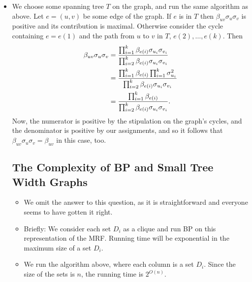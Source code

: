 \documentclass[11pt]{article} \usepackage{amssymb}
\begin{document}
\begin{itemize}
\item We choose some spanning tree $T$ on the graph, and run the same
  algorithm as above. Let $e=(u,v)$ be some edge of the graph. If $e$
  is in $T$ then $\beta_{uv}\sigma_u\sigma_v$ is positive and its
  contribution is maximal. Otherwise consider the cycle containing $e=e(1)$
  and the path from $u$ to $v$ in $T$, $e(2),\ldots,e(k)$. Then 
  \begin{align*}
    \beta_{uv}\sigma_u\sigma_v &=
    {\prod_{i=1}^k\beta_{e(i)}\sigma_{u_i}\sigma_{v_i}
      \over
      \prod_{i=2}^k\beta_{e(i)}\sigma_{u_i}\sigma_{v_i}
    }
    \\ &= 
    {\prod_{i=1}^k\beta_{e(i)}\prod_{i=1}^k\sigma_{u_i}^2
      \over
      \prod_{i=2}^k\beta_{e(i)}\sigma_{u_i}\sigma_{v_i}
    }
    \\ &= 
    {\prod_{i=1}^k\beta_{e(i)}
      \over
      \prod_{i=2}^k\beta_{e(i)}\sigma_{u_i}\sigma_{v_i}
    }.
  \end{align*}
  Now, the numerator is positive by the stipulation on the graph's
  cycles, and the denominator is positive by our assignments, and so
  it follows that  $\beta_{uv}\sigma_u\sigma_v=\beta_{uv}$ in this
  case, too.


\subsection{The Complexity of BP and Small Tree Width Graphs}
\begin{itemize}
\item We omit the answer to this question, as it is straightforward
  and everyone seems to have gotten it right.
\item Briefly: We consider each set $D_i$ as a clique and run BP on
  this representation of the MRF. Running time will be exponential in
  the maximum size of a set $D_i$. 
\item We run the algorithm above, where each column is a set
  $D_i$. Since the size of the sets is $n$, the running time is $2^{O(n)}$.
\end{itemize}

\end{itemize}
\end{document}
